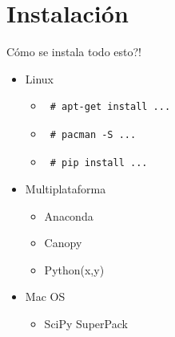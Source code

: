 \documentclass[xcolor=dvipsnames]{beamer}
\begin{document}
\section{Instalación}
\begin{frame}[fragile]{Cómo se instala todo esto?!}
	\begin{itemize}
		\item Linux
		\begin{itemize}
			\item \begin{verbatim} # apt-get install ... \end{verbatim}
			\item \begin{verbatim} # pacman -S ... \end{verbatim}
			\item \begin{verbatim} # pip install ...\end{verbatim}
		\end{itemize}
		\item Multiplataforma
		\begin{itemize}
			\item Anaconda
			\item Canopy
			\item Python(x,y)
		\end{itemize}
		\item Mac OS
		\begin{itemize}
			\item SciPy SuperPack
		\end{itemize}
	\end{itemize}
\end{frame}
\end{document}
